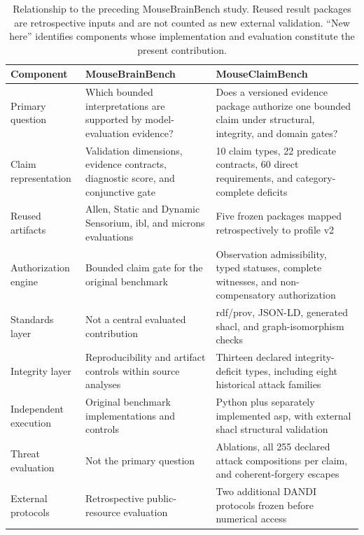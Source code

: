 \begin{table}[!htbp]
\centering
\caption{Relationship to the preceding MouseBrainBench study. Reused result packages are retrospective inputs and are not counted as new external validation. ``New here'' identifies components whose implementation and evaluation constitute the present contribution.}
\label{tab:mousebrainbench-relationship}
\scriptsize
\renewcommand{\arraystretch}{1.00}
\begin{tabularx}{\textwidth}{@{}P{0.21\textwidth}P{0.35\textwidth}Y@{}}
\toprule
Component & MouseBrainBench & MouseClaimBench \\
\midrule
Primary question & Which bounded interpretations are supported by model-evaluation evidence? & Does a versioned evidence package authorize one bounded claim under structural, integrity, and domain gates? \\
Claim representation & Validation dimensions, evidence contracts, diagnostic score, and conjunctive gate & 10 claim types, 22 predicate contracts, 60 direct requirements, and category-complete deficits \\
Reused artifacts & Allen, Static and Dynamic Sensorium, \ac{ibl}, and \ac{microns} evaluations & Five frozen packages mapped retrospectively to profile v2 \\
Authorization engine & Bounded claim gate for the original benchmark & Observation admissibility, typed statuses, complete witnesses, and non-compensatory authorization \\
Standards layer & Not a central evaluated contribution & \ac{rdf}/\ac{prov}, JSON-LD, generated \ac{shacl}, and graph-isomorphism checks \\
Integrity layer & Reproducibility and artifact controls within source analyses & Thirteen declared integrity-deficit types, including eight historical attack families \\
Independent execution & Original benchmark implementations and controls & Python plus separately implemented \ac{asp}, with external \ac{shacl} structural validation \\
Threat evaluation & Not the primary question & Ablations, all 255 declared attack compositions per claim, and coherent-forgery escapes \\
External protocols & Retrospective public-resource evaluation & Two additional DANDI protocols frozen before numerical access \\
\bottomrule
\end{tabularx}
\end{table}
